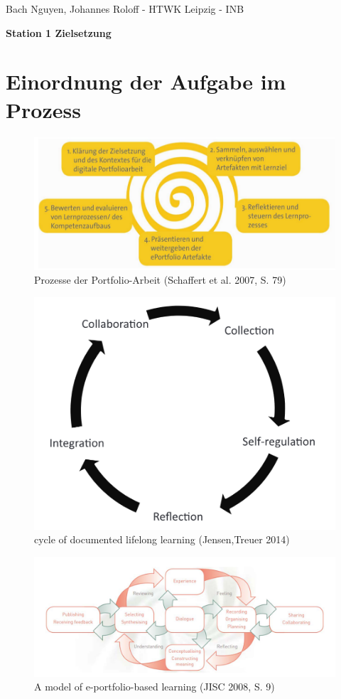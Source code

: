 \documentclass[a4paper,oneside]{scrarticle}
\begin{document}
	\begin{flushleft}
		Bach Nguyen, Johannes Roloff - HTWK Leipzig - INB
	\end{flushleft}
	\begin{center}
		\begin{LARGE}
			\textbf{Station 1 Zielsetzung}
		\end{LARGE}
	\end{center}
	\section*{Einordnung der Aufgabe im Prozess}
	\begin{figure} [h]
		\centering
		\includegraphics[width=0.7\linewidth]{e-portfolio-prozesse-schaffert}
		\caption{Prozesse der Portfolio-Arbeit (Schaffert et al. 2007, S. 79)}
		\label{fig:e-portfolio-prozesse-schaffert}
	\end{figure}
	\begin{figure}[h]
		\centering
		\includegraphics[width=0.5\linewidth]{cycle-of-documented-lifelong-learning-Jensen}
		\caption{cycle of documented lifelong learning (Jensen,Treuer 2014)}
		\label{fig:cycle-of-documented-lifelong-learning-jensen}
	\end{figure}
	\begin{figure}[h]
		\centering
		\includegraphics[width=0.8\linewidth]{model-of-e-portfolio-based-learning}
		\caption{A model of e-portfolio-based learning (JISC 2008, S. 9)}
		\label{fig:model-of-e-portfolio-based-learning}
	\end{figure}
	\pagebreak 
	
\end{document}
